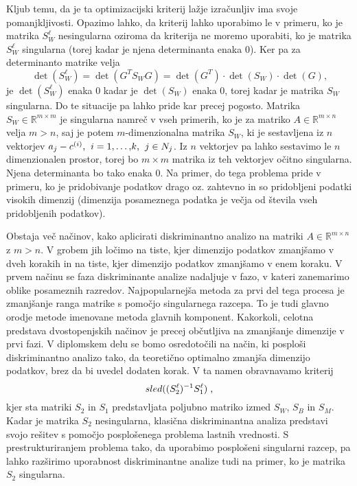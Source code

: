\documentclass[mat1]{article}
\begin{document}
Kljub temu, da je ta optimizacijski kriterij lažje izračunljiv ima svoje pomanjkljivosti. Opazimo lahko, da kriterij lahko uporabimo le v primeru, ko je matrika $S_W^\ell$ nesingularna oziroma da kriterija ne moremo uporabiti, ko je matrika $S_W^\ell$ singularna (torej kadar je njena determinanta enaka 0). Ker pa za determinanto matrike velja
$$ \det(S_W^\ell) = \det(G^T S_W G) = \det(G^T) \cdot \det(S_W) \cdot \det(G) \text{,}
$$
je $\det(S_W^\ell)$ enaka 0 kadar je $\det(S_W)$ enaka 0, torej kadar je matrika $S_W$ singularna. Do te situacije pa lahko pride kar precej pogosto. Matrika $S_W \in  \mathbb{R}^{m \times m}$ je singularna namreč v vseh primerih, ko je za matriko $A \in  \mathbb{R}^{m \times n}$ velja $m > n$, saj je potem $m$-dimenzionalna matrika $S_W$, ki je sestavljena iz $n$ vektorjev $a_j - c^{(i)} \text{,} \hspace{2mm}  i = 1,\ldots \text{,} k \text{,} \hspace{2mm} j \in N_j $. Iz $n$ vektorjev pa lahko sestavimo le $n$ dimenzionalen prostor, torej bo $m \times m$ matrika iz teh vektorjev očitno singularna. Njena determinanta bo tako enaka 0.
Na primer, do tega problema pride v primeru, ko je pridobivanje podatkov drago oz. zahtevno in so pridobljeni podatki visokih dimenzij (dimenzija posameznega podatka je večja od števila vseh pridobljenih podatkov).

Obstaja več načinov, kako aplicirati diskriminantno analizo na matriki $A \in \mathbb{R}^{m \times n}$ z $m > n$. V grobem jih ločimo na tiste, kjer dimenzijo podatkov zmanjšamo v dveh korakih in na tiste, kjer dimenzijo podatkov zmanjšamo v enem koraku. V prvem načinu se faza diskriminante analize nadaljuje v fazo, v kateri zanemarimo oblike posameznih razredov. Najpopularnejša metoda za prvi del tega procesa je zmanjšanje ranga matrike s pomočjo singularnega razcepa. To je tudi glavno orodje metode imenovane metoda glavnih komponent. Kakorkoli, celotna predstava dvostopenjskih načinov je precej občutljiva na zmanjšanje dimenzije v prvi fazi. V diplomskem delu se bomo osredotočili na način, ki posploši diskriminantno analizo tako, da teoretično optimalno zmanjša dimenzijo podatkov, brez da bi uvedel dodaten korak. V ta namen obravnavamo kriterij 
$$ sled((S_2^\ell)^{-1} S_1^\ell) \hspace{1mm} \text{,}
$$
kjer sta matriki $S_2$ in $S_1$ predstavljata poljubno matriko izmed $S_W$, $S_B$ in $S_M$.  Kadar je matrika $S_2$ nesingularna, klasična diskriminantna analiza predstavi svojo rešitev s pomočjo posplošenega problema lastnih vrednosti. S prestrukturiranjem problema tako, da uporabimo posplošeni singularni razcep, pa lahko razširimo uporabnost diskriminantne analize tudi na primer, ko je matrika $S_2$ singularna.
\end{document}
